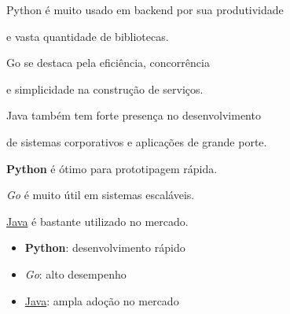 \documentclass{article}
\begin{document}
Python é muito usado em backend por sua produtividade

e vasta quantidade de bibliotecas.


Go se destaca pela eficiência, concorrência

e simplicidade na construção de serviços.


Java também tem forte presença no desenvolvimento

de sistemas corporativos e aplicações de grande porte.


\textbf{Python} é ótimo para prototipagem rápida.

\textit{Go} é muito útil em sistemas escaláveis.

\underline{Java} é bastante utilizado no mercado.


\begin{itemize}

    \item \textbf{Python}: desenvolvimento rápido

    \item \textit{Go}: alto desempenho

    \item \underline{Java}: ampla adoção no mercado

\end{itemize}
\end{document}
